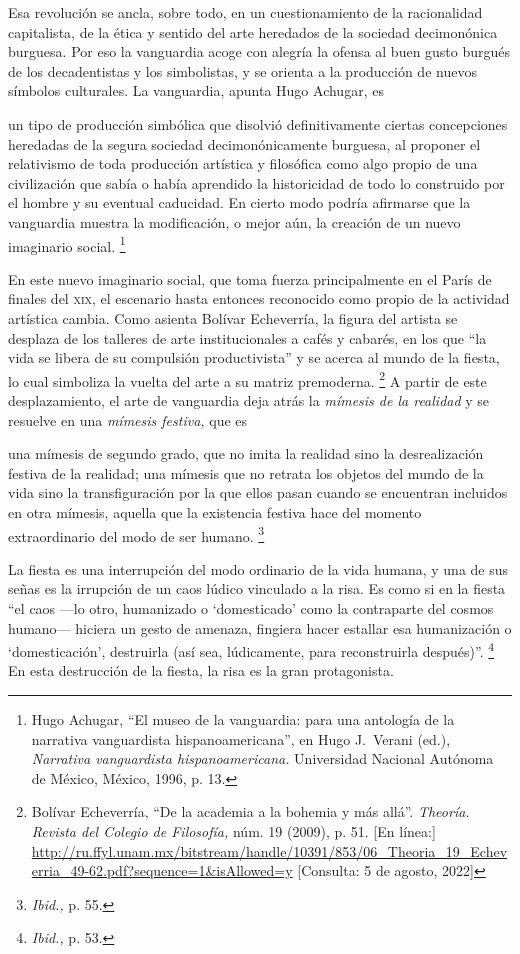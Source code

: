 \documentclass[14pt,twoside,final]{extbook} %
\let\oldfootnote\footnote
\renewcommand\footnote[1]{%
\oldfootnote{\hspace{1mm}#1}}
\begin{document}
Esa revolución se ancla, sobre todo, en un cuestionamiento de la racionalidad capitalista, de la ética y sentido del arte heredados de la sociedad decimonónica burguesa. Por eso la vanguardia acoge con alegría la ofensa al buen gusto burgués de los decadentistas y los simbolistas, y se orienta a la producción de nuevos símbolos culturales. La vanguardia, apunta Hugo Achugar, es
\begin{quoting}
un tipo de producción simbólica que disolvió definitivamente ciertas concepciones heredadas de la segura sociedad decimonónicamente burguesa, al proponer el relativismo de toda producción artística y
filosófica como algo propio de una civilización que sabía o había aprendido la historicidad de todo lo construido por el hombre y su eventual caducidad. En cierto modo podría afirmarse que la vanguardia muestra la modificación, o mejor aún, la creación de un nuevo imaginario social.\footnote{Hugo Achugar, ``El museo de la vanguardia: para una antología de la narrativa vanguardista hispanoamericana'', en Hugo J.~Verani (ed.), \emph{Narrativa vanguardista hispanoamericana.} Universidad Nacional Autónoma de México, México, 1996, p. 13.}
\end{quoting}
En este nuevo imaginario social, que toma fuerza principalmente en el París de finales del \textsc{xix}, el escenario hasta entonces reconocido como propio de la actividad artística cambia. Como asienta Bolívar Echeverría, la figura del artista se desplaza de los talleres de arte institucionales a cafés y cabarés, en los que ``la vida se libera de su compulsión productivista'' y se acerca al mundo de la fiesta, lo cual simboliza la vuelta del arte a su matriz premoderna.\footnote{Bolívar Echeverría, ``De la academia a la bohemia y más allá''. \emph{Theoría. Revista del Colegio de Filosofía,} núm. 19 (2009), p. 51. [En línea:] \url{http://ru.ffyl.unam.mx/bitstream/handle/10391/853/06_Theoria_19_Echeverria_49-62.pdf?sequence=1&isAllowed=y} [Consulta: 5 de agosto, 2022]} A partir de este desplazamiento, el arte de vanguardia deja atrás la \emph{mímesis de la realidad} y se resuelve en una \emph{mímesis festiva,} que es
\begin{quoting}
una mímesis de segundo grado, que no imita la realidad sino la desrealización festiva de la realidad; una mímesis que no retrata los objetos del mundo de la vida sino la transfiguración por la que ellos
pasan cuando se encuentran incluidos en otra mímesis, aquella que la existencia festiva hace del momento extraordinario del modo de ser humano.\footnote{\emph{Ibid.,} p. 55.}
\end{quoting}
La fiesta es una interrupción del modo ordinario de la vida humana, y una de sus señas es la irrupción de un caos lúdico vinculado a la risa. Es como si en la fiesta ``el caos ---lo otro, humanizado o `domesticado' como la contraparte del cosmos humano--- hiciera un gesto de amenaza,
fingiera hacer estallar esa humanización o `domesticación', destruirla (así sea, lúdicamente, para reconstruirla después)''.\footnote{\emph{Ibid.,} p. 53.} En esta destrucción de la fiesta, la risa es la gran protagonista.
\end{document}
